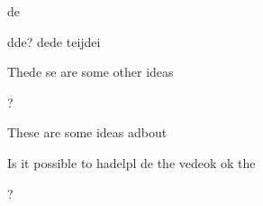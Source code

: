 
de

dde?
dede
teijdei 

Thede se are some other ideas  

?

These are some ideas adbout 

Is it possible to hadelpl de the vedeok ok the  

?

\begin{quote}
\end{quote}


